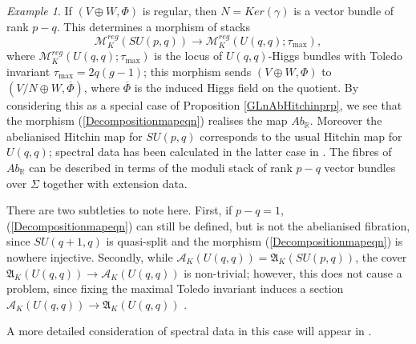 \documentclass{amsart}
\theoremstyle{remark}
\newtheorem{example}[theorem]{Example}
\numberwithin{theorem}{section}
\numberwithin{equation}{section}
\begin{document}
\begin{example}
If $(V \oplus W, \Phi)$ is regular, then $N = Ker(
\gamma)$ is a vector bundle of rank $p-q$. This determines a morphism of stacks
\begin{equation}\label{Decompositionmapeqn}
    \mathcal M^{reg}_K(SU(p,q)) \rightarrow \mathcal M^{reg}_K(U(q,q);\tau_{\max}),
\end{equation}
where $\mathcal M_K^{reg}(U(q,q);\tau_{\max})$ is the locus of $U(q,q)$-Higgs bundles with Toledo invariant $\tau_{\max} = 2q(g-1)$; this morphism sends $(V \oplus W,\Phi)$ to $(V/N \oplus W, \overline{\Phi})$, where $\overline{\Phi}$ is the induced Higgs field on the quotient. By considering this as a special case of Proposition \ref{GLnAbHitchinprp}, we see that the morphism (\ref{Decompositionmapeqn}) realises the map ${ Ab}_{\mathbb{R}}$. Moreover the abelianised Hitchin map for $SU(p,q)$ corresponds to the usual Hitchin map for $U(q,q)$; spectral data has been calculated in the latter case in \cite{Schaposnik}. The fibres of ${ Ab}_{\mathbb{R}}$ can be described in terms of the moduli stack of rank $p-q$ vector bundles over $\Sigma$ together with extension data.

There are two subtleties to note here. First, if $p-q=1$, (\ref{Decompositionmapeqn}) can still be defined, but is not the abelianised fibration, since $SU(q+1,q)$ is quasi-split and the morphism (\ref{Decompositionmapeqn}) is nowhere injective. Secondly, while $\mathcal A_K(U(q,q)) = \mathfrak{A}_K(SU(p,q))$, the cover $\mathfrak{ A}_K(U(q,q)) \rightarrow \mathcal A_K( U(q,q))$ is non-trivial; however, this does not cause a problem, since fixing the maximal Toledo invariant induces a section $\mathcal A_K( U(q,q)) \rightarrow \mathfrak{ A}_K(U(q,q))$ \cite[Section 6]{HM}.

A more detailed consideration of spectral data in this case will appear in \cite{FruPN}.
\end{example}
\end{document}
